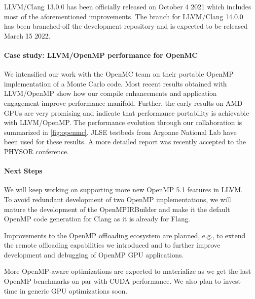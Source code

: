 LLVM/Clang 13.0.0 has been officially released on October 4 2021 which includes most of the aforementioned improvements. The branch for LLVM/Clang 14.0.0 has been branched-off the development repository and is expected to be released March 15 2022.


\paragraph{Case study: LLVM/OpenMP performance for OpenMC}

We intensified our work with the OpenMC team on their portable OpenMP implementation of a Monte Carlo code.
Most recent results obtained with LLVM/OpenMP show how our compile enhancements and application engagement improve performance manifold.
Further, the early results on AMD GPUs are very promising and indicate that performance portability is achievable with LLVM/OpenMP.
The performance evolution through our collaboration is summarized in \autoref{fig:openmc}. JLSE testbeds from Argonne National Lab have been used for these results.  
A more detailed report was recently accepted to the PHYSOR conference.



\paragraph{Next Steps}
We will keep working on supporting more new OpenMP 5.1 features in LLVM.
%
To avoid redundant development of two OpenMP implementations, we will mature the development of the OpenMPIRBuilder and make it the default OpenMP code generation for Clang as it is already for Flang.

Improvements to the OpenMP offloading ecosystem are planned, e.g., to extend the remote offloading capabilities we introduced and to further improve development and debugging of OpenMP GPU applications.

More OpenMP-aware optimizations are expected to materialize as we get the last OpenMP benchmarks on par with CUDA performance. We also plan to invest time in generic GPU optimizations soon.

